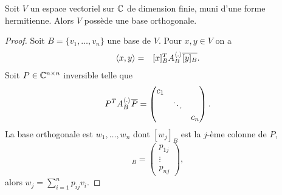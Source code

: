 \begin{theorem}
  \label{thr:11}
  Soit $V$ un espace vectoriel sur $\mathbb{C}$ de dimension finie, muni d'une forme  hermitienne. Alors $V$ possède une base orthogonale. 
\end{theorem}
\begin{proof}
  Soit $B = \{v_1,\dots,v_n\}$  une base de $V$. Pour $x,y \in V$ on a 
  \begin{eqnarray*}
    \langle {x,y} \rangle & = & [x]_B^T A_B^{\langle {.} \rangle} \overline{[y]_B}. 
  \end{eqnarray*}
  Soit $P \in \mathbb{C}^{n\times n} $ inversible telle que
  \begin{displaymath}
    P^T A_B^{\langle {.} \rangle} \overline{P} =
    \begin{pmatrix}
      c_1\\
      & \ddots \\
      && c_n
    \end{pmatrix}. 
  \end{displaymath}
  La base orthogonale est $w_1,\dots,w_n$ dont $ [w_j]_B$ est  la $j$-ème colonne de $P$, 
  \begin{displaymath}
     [w_j]_B =
  \begin{pmatrix}
    p_{1j}\\ \vdots \\ p_{nj}
  \end{pmatrix}, 
  \end{displaymath} 
alors $w_j = \sum_{i=1}^n p_{ij} v_i$. 

\end{proof}



